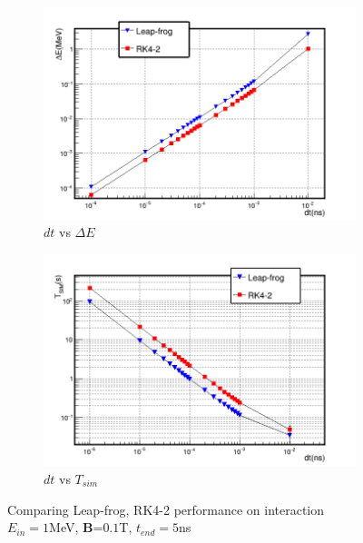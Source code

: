 \documentclass[a4paper,oneside,12pt]{report}
\numberwithin{equation}{chapter}
\begin{document}
\begin{figure}[H]
    \captionsetup[subfigure]{justification=centering}
    \captionsetup{justification=centering}
    \centering
    \begin{subfigure}{0.8\textwidth}
        \centering
        \includegraphics[width=\linewidth]{./figures/analiz/mag_lf_rk2_dt-E.png}
        \caption*{$dt$ vs $\Delta E$}
    \end{subfigure}
    
    \begin{subfigure}{0.8\textwidth}
        \centering
        \includegraphics[width=\linewidth]{./figures/analiz/mag_lf_rk2_dt-Tsim.png}
        \caption*{$dt$ vs $T_{sim}$}
    \end{subfigure}
    \caption{Comparing Leap-frog, RK4-2 performance on \eB interaction\\ $E_{in}=1$MeV, \textbf{B}=$0.1$T, $t_{end}=5$ns}
    \label{fig:mag_lf_rk2_comparison}
\end{figure}
\end{document}
